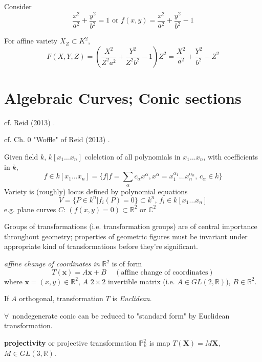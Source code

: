 \documentclass[10pt]{amsart}
\begin{document}
\begin{multicols*}{2}
Consider 
\begin{equation}
\frac{x^2}{a^2} + \frac{y^2}{b^2} = 1 \text{ or } f(x,y) = \frac{x^2}{a^2} + \frac{y^2}{b^2} -1
\end{equation}

For affine variety $X_Z \subset K^2$, 
\begin{equation}
F(X,Y,Z) = \left( \frac{X^2}{Z^2 a^2} + \frac{Y^2}{Z^2 b^2} - 1 \right) Z^2 = \frac{X^2}{a^2} + \frac{Y^2}{b^2} - Z^2
\end{equation}



\section{Algebraic Curves; Conic sections}

cf. Reid (2013) \cite{Reid2013}.

cf. Ch. 0 "Woffle" of Reid (2013) \cite{Reid2013}.

Given field $k$, $k[x_1 \dots x_n]$ colelction of all polynomials in $x_1 \dots x_n$, with coefficients in $k$, 
\[
f  \in k[x_1 \dots x_n] = \lbrace f | f = \sum_{\alpha} c_{\alpha} x^{\alpha}, x^{\alpha} = x_1^{\alpha_1} \dots x_n^{\alpha_n}, \, c_{\alpha} \in k \rbrace 
\]
Variety is (roughly) locus defined by polynomial equations
\[
V = \lbrace P \in k^n | f_i(P) = 0 \rbrace \subset k^n, \, f_i \in k[x_1 \dots x_n]
\]
e.g. plane curves $C$: $(f(x,y) = 0) \subset \mathbb{R}^2$ or $\mathbb{C}^2$


Groups of transformations (i.e. transformation groups) are of central importance throughout geometry; properties of geometric figures must be invariant under appropriate kind of transformations before they're significant.

\emph{affine change of coordinates in} $\mathbb{R}^2$ is of form
\begin{equation}
T(\mathbf{x}) = A \mathbf{x} + B \quad \, (\text{affine change of coordinates})
\end{equation}
where $\mathbf{x} = (x,y) \in \mathbb{R}^2$, $A$ $2\times 2$ invertible matrix (i.e. $A \in GL(2, \mathbb{R})$), $B\in \mathbb{R}^2$. 

If $A$ orthogonal, transformation $T$ is \emph{Euclidean}.

$\forall \, $ nondegenerate conic can be reduced to "standard form" by Euclidean transformation.

\textbf{projectivity} or projective transformation $\mathbb{P}^2_{\mathbb{R}}$ is map $T(\mathbf{X}) = M \mathbf{X}$, $M \in GL(3, \mathbb{R})$.  


\end{multicols*}
\end{document}
